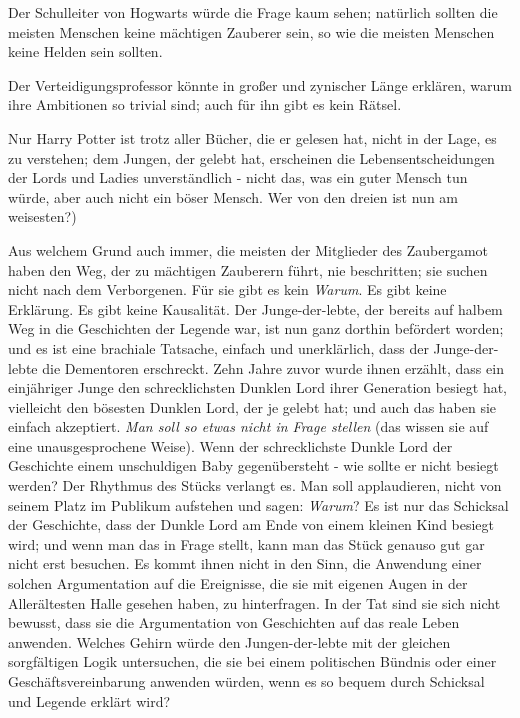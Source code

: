 Der Schulleiter von Hogwarts würde die Frage kaum sehen; natürlich sollten die
meisten Menschen keine mächtigen Zauberer sein, so wie die meisten Menschen
keine Helden sein sollten.

Der Verteidigungsprofessor könnte in großer und zynischer Länge erklären, warum
ihre Ambitionen so trivial sind; auch für ihn gibt es kein Rätsel.

Nur Harry Potter ist trotz aller Bücher, die er gelesen hat, nicht in der Lage,
es zu verstehen; dem Jungen, der gelebt hat, erscheinen die Lebensentscheidungen
der Lords und Ladies unverständlich - nicht das, was ein guter Mensch tun würde,
aber auch nicht ein böser Mensch. Wer von den dreien ist nun am weisesten?)

Aus welchem Grund auch immer, die meisten der Mitglieder des Zaubergamot haben
den Weg, der zu mächtigen Zauberern führt, nie beschritten; sie suchen nicht
nach dem Verborgenen. Für sie gibt es kein \emph{Warum}. Es gibt keine
Erklärung. Es gibt keine Kausalität. Der Junge-der-lebte, der bereits auf halbem
Weg in die Geschichten der Legende war, ist nun ganz dorthin befördert worden;
und es ist eine brachiale Tatsache, einfach und unerklärlich, dass der
Junge-der-lebte die Dementoren erschreckt. Zehn Jahre zuvor wurde ihnen erzählt,
dass ein einjähriger Junge den schrecklichsten Dunklen Lord ihrer Generation
besiegt hat, vielleicht den bösesten Dunklen Lord, der je gelebt hat; und auch
das haben sie einfach akzeptiert. \emph{Man soll so etwas nicht in Frage
stellen} (das wissen sie auf eine unausgesprochene Weise). Wenn der
schrecklichste Dunkle Lord der Geschichte einem unschuldigen Baby gegenübersteht
- wie sollte er nicht besiegt werden? Der Rhythmus des Stücks verlangt es. Man
soll applaudieren, nicht von seinem Platz im Publikum aufstehen und sagen: \glqq
\emph{Warum}?\grqq{} Es ist nur das Schicksal der Geschichte, dass der Dunkle
Lord am Ende von einem kleinen Kind besiegt wird; und wenn man das in Frage
stellt, kann man das Stück genauso gut gar nicht erst besuchen. Es kommt ihnen
nicht in den Sinn, die Anwendung einer solchen Argumentation auf die Ereignisse,
die sie mit eigenen Augen in der Allerältesten Halle gesehen haben, zu
hinterfragen. In der Tat sind sie sich nicht bewusst, dass sie die Argumentation
von Geschichten auf das reale Leben anwenden. Welches Gehirn würde den
Jungen-der-lebte mit der gleichen sorgfältigen Logik untersuchen, die sie bei
einem politischen Bündnis oder einer Geschäftsvereinbarung anwenden würden, wenn
es so bequem durch Schicksal und Legende erklärt wird?


